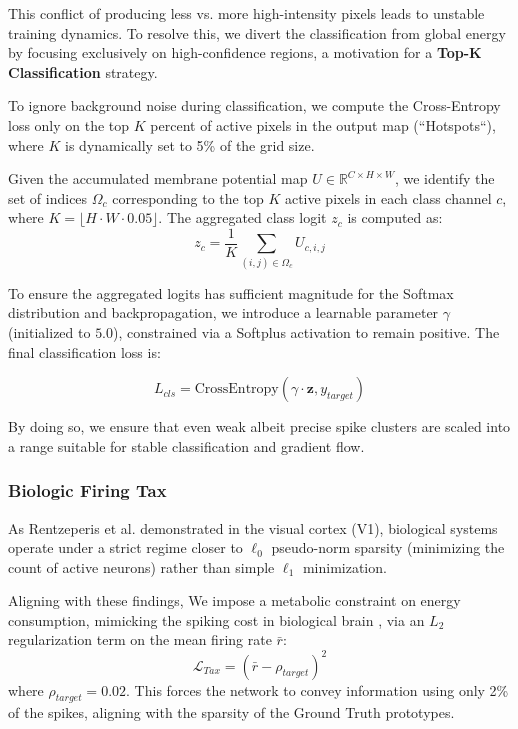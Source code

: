 \documentclass[conference]{IEEEtran}
\begin{document}
This conflict of producing less vs. more high-intensity pixels leads to unstable training dynamics. To resolve this, we divert the classification from global energy by focusing exclusively on high-confidence regions, a motivation for a \textbf{Top-K Classification} strategy. 

To ignore background noise during classification, we compute the Cross-Entropy loss only on the top $K$ percent of active pixels in the output map (``Hotspots``), where $K$ is dynamically set to 5\% of the grid size. 

Given the accumulated membrane potential map $U \in \mathbb{R}^{C \times H \times W}$, we identify the set of indices $\Omega_c$ corresponding to the top $K$ active pixels in each class channel $c$, where $K = \lfloor H \cdot W \cdot 0.05 \rfloor$. The aggregated class logit $z_c$ is computed as:
\begin{equation}
    z_c = \frac{1}{K} \sum_{(i,j) \in \Omega_c} U_{c,i,j}
\end{equation}

To ensure the aggregated logits has sufficient magnitude for the Softmax distribution and backpropagation, we introduce a learnable parameter $\gamma$ (initialized to $5.0$), constrained via a Softplus activation to remain positive. The final classification loss is:

\begin{equation}
    L_{cls} = \text{CrossEntropy}(\gamma \cdot \mathbf{z}, y_{target})
\end{equation}

By doing so, we ensure that even weak albeit precise spike clusters are scaled into a range suitable for stable classification and gradient flow.

\subsubsection{Biologic Firing Tax}
As Rentzeperis et al. \cite{Rentzeperis2023} demonstrated in the visual cortex (V1), biological systems operate under a strict regime closer to $\ell_{0}$ pseudo-norm sparsity (minimizing the count of active neurons) rather than simple $\ell_{1}$ minimization.

Aligning with these findings, We impose a metabolic constraint on energy consumption, mimicking the spiking cost in biological brain \cite{Lennie2003}, via an $L_2$ regularization term on the mean firing rate $\bar{r}$:
\begin{equation}
    \mathcal{L}_{Tax} = (\bar{r} - \rho_{target})^2
\end{equation}
where $\rho_{target} = 0.02$. This forces the network to convey information using only 2\% of the spikes, aligning with the sparsity of the Ground Truth prototypes.
\end{document}
